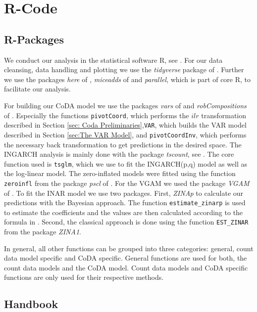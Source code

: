 \section{R-Code}
\label{sec:R-Code}

\subsection{R-Packages}
\label{sec:R-Packages}

We conduct our analysis in the statistical software R, see \textcite{R:2022}. For our data cleansing, data handling and plotting we use the \textit{tidyverse} package of \textcite{Tidyverse:2019}. Further we use the packages \textit{here} of \textcite{here:2020}, \textit{miceadds} of \textcite{Miceadds:2023} and \textit{parallel}, which is part of core R, to facilitate our analysis.  

For building our CoDA model we use the packages \textit{vars} of \textcite{VAR:2008,CoDAR2:2008} and \textit{robCompositions} of \textcite{RobComp:2011,CoDAR4:2018}. Especially the functions \texttt{pivotCoord}, which performs the $ilr$ transformation described in Section \ref{sec: Coda Preliminaries},\texttt{VAR}, which builds the VAR model described in Section \ref{sec:The VAR Model}, and \texttt{pivotCoordInv}, which performs the necessary back transformation to get predictions in the desired space. The INGARCH analysis is mainly done with the package \textit{tscount}, see \textcite{Tscount:2017,Tscount:2020}. The core function used is \texttt{tsglm}, which we use to fit the INGARCH(p,q) model as well as the log-linear model. The zero-inflated models were fitted using the function \texttt{zeroinfl} from the package \textit{pscl} of \textcite{Pscl:2008}. For the VGAM we used the package \textit{VGAM} of \textcite{RVGAM:2010}. To fit the INAR model we use two packages. First, \textit{ZINAp} to calculate our predictions with the Bayesian approach. The function \texttt{estimate\_zinarp} is used to estimate the coefficients and the values are then calculated according to the formula in \textcite{Silva:2009}. Second, the classical approach is done using the function \texttt{EST\_ZINAR} from the package \textit{ZINA1}.

In general, all other functions can be grouped into three categories: general, count data model specific and CoDA specific. General functions are used for both, the count data models and the CoDA model. Count data models and CoDA specific functions are only used for their respective methods.
\subsection{Handbook}
\label{sec:Handbook}

